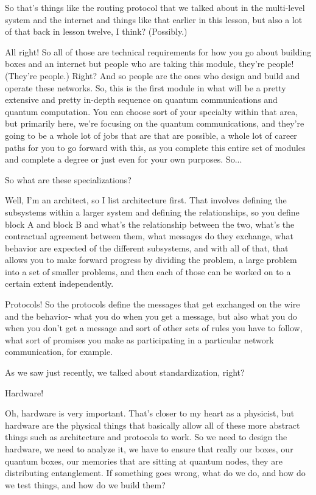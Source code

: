 So that's things like the routing protocol that we talked about in the multi-level system and the internet and things like that earlier in this lesson, but also a lot of that back in lesson twelve, I think? (Possibly.)

All right! So all of those are technical requirements for how you go about building boxes and an internet but people who are taking this module, they're people! (They're people.) Right? And so people are the ones who design and build and operate these networks. So, this is the first module in what will be a pretty extensive and pretty in-depth sequence on quantum communications and quantum computation. You can choose sort of your specialty within that area, but primarily here, we're focusing on the quantum communications, and they're going to be a whole lot of jobs that are that are possible, a whole lot of career paths for you to go forward with this, as you complete this entire set of modules and complete a degree or just even for your own purposes. So...

So what are these specializations?

Well, I'm an architect, so I list architecture first. That involves defining the subsystems within a larger system and defining the relationships, so you define block A and block B and what's the relationship between the two, what's the contractual agreement between them, what messages do they exchange, what behavior are expected of the different subsystems, and with all of that, that allows you to make forward progress by dividing the problem, a large problem into a set of smaller problems, and then each of those can be worked on to a certain extent independently.

Protocols! So the protocols define the messages that get exchanged on the wire and the behavior- what you do when you get a message, but also what you do when you don't get a message and sort of other sets of rules you have to follow, what sort of promises you make as participating in a particular network communication, for example.

As we saw just recently, we talked about standardization, right?

Hardware!

Oh, hardware is very important. That's closer to my heart as a physicist, but hardware are the physical things that basically allow all of these more abstract things such as architecture and protocols to work. So we need to design the hardware, we need to analyze it, we have to ensure that really our boxes, our quantum boxes, our memories that are sitting at quantum nodes, they are distributing entanglement. If something goes wrong, what do we do, and how do we test things, and how do we build them?

